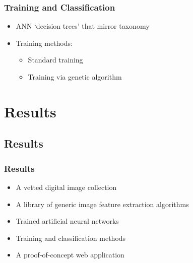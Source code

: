 \documentclass[]{beamer}
\begin{document}
    \begin{frame}
        \frametitle{Training and Classification}

        \begin{itemize}
            \item ANN `decision trees' that mirror taxonomy{\newline}


            \vspace{5 mm}

        \item Training methods:
            \begin{itemize}
                \item Standard training
                \item Training via genetic algorithm
            \end{itemize}
        \end{itemize}
    \end{frame}


\section{Results}

    \subsection{Results}

    \begin{frame}
        \frametitle{Results}

        \begin{itemize}
            \item A vetted digital image collection
            \item A library of generic image feature extraction algorithms
            \item Trained artificial neural networks
            \item Training and classification methods
            \item A proof-of-concept web application
        \end{itemize}
    \end{frame}
\end{document}
